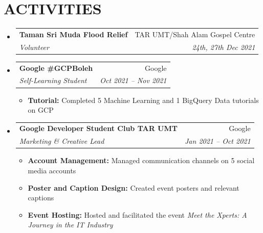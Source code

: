 \documentclass[a4paper,11pt]{article}
\makeatletter
\newcommand{\resumeItem}[2]{
  \item\small{
    \textbf{{#1:} }{#2 \vspace{-2pt}}
  }
}
\newcommand{\resumeSubheading}[4]{
  \vspace{-1pt}\item
    \begin{tabular*}{0.97\textwidth}[t]{l@{\extracolsep{\fill}}r}
      \textbf{\color{MyBlue} #1} & {\footnotesize#2} \\
      \textit{\footnotesize #3} & \textit{\footnotesize #4} \\
    \end{tabular*}\vspace{-5pt}
}
\newcommand{\resumeSubHeadingListStart}{\begin{itemize}[leftmargin=*]}
\newcommand{\resumeSubHeadingListEnd}{\end{itemize}}
\newcommand{\resumeItemListStart}{\begin{itemize}}
\newcommand{\resumeItemListEnd}{\end{itemize}\vspace{-5pt}}
\makeatother
\begin{document}
\section{ACTIVITIES}

\resumeSubHeadingListStart
\resumeSubheading{Taman Sri Muda Flood Relief}{TAR UMT/Shah Alam Gospel Centre}{Volunteer}{24th, 27th Dec 2021}
\resumeSubheading{Google \#GCPBoleh}{Google}{Self-Learning Student}{Oct 2021 -- Nov 2021}
\resumeItemListStart
\resumeItem{Tutorial}{Completed 5 Machine Learning and 1 BigQuery Data tutorials on GCP}
\resumeItemListEnd
\resumeSubheading{Google Developer Student Club TAR UMT}{Google}
{Marketing \& Creative Lead}{Jan 2021 -- Oct 2021}
\resumeItemListStart
\resumeItem{Account Management}{Managed communication channels on 5 social media accounts}
\resumeItem{Poster and Caption Design}{Created event posters and relevant captions}
\resumeItem{Event Hosting}{Hosted and facilitated the event \textit{Meet the Xperts: A Journey in the IT Industry}}
\resumeItemListEnd
\resumeSubHeadingListEnd


\end{document}
